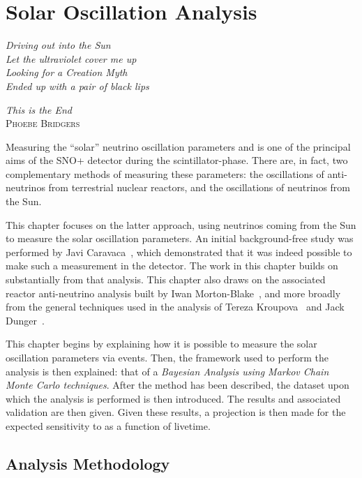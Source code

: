 \chapter{Solar Oscillation Analysis}\label{chap:solar_osc_analysis}
\epigraph{\textit{Driving out into the Sun\\Let the ultraviolet cover me up\\Looking for a Creation Myth\\Ended up with a pair of black lips}}{\textit{This is the End}\\ \textsc{Phoebe Bridgers}}
Measuring the ``solar'' neutrino oscillation parameters \dmsq{} and \tonetwo{} is one of the principal aims of the SNO+ detector during the scintillator-phase. There are, in fact, two complementary methods of measuring these parameters: the oscillations of anti-neutrinos from terrestrial nuclear reactors, and the oscillations of neutrinos from the Sun.

This chapter focuses on the latter approach, using \beight{} neutrinos coming from the Sun to measure the solar oscillation parameters. An initial background-free study was performed by Javi Caravaca~\cite{}, %
which demonstrated that it was indeed possible to make such a measurement in the detector. The work in this chapter builds on substantially from that analysis. This chapter also draws on the associated reactor anti-neutrino analysis built by Iwan Morton-Blake~\cite{}, %
and more broadly from the general techniques used in the \onbb{} analysis of Tereza Kroupova~\cite{} and Jack Dunger~\cite{}.%

This chapter begins by explaining how it is possible to measure the solar oscillation parameters via \beight{} events. Then, the framework used to perform the analysis is then explained: that of a \textit{Bayesian Analysis using Markov Chain Monte Carlo techniques}. After the method has been described, the dataset upon which the analysis is performed is then introduced. The results and associated validation are then given. Given these results, a projection is then made for the expected sensitivity to \tonetwo{} as a function of livetime.


\section{Analysis Methodology}\label{sec:analysis_method}
